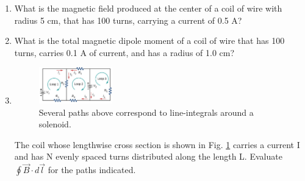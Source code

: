 \documentclass[10pt]{article}
\begin{document}
\begin{enumerate}
\begin{enumerate}
\item What is the magnetic field produced at the center of a coil of wire with radius 5 cm, that has 100 turns, carrying a current of 0.5 A? \\ \vspace{2 cm}
\item What is the total magnetic dipole moment of a coil of wire that has 100 turns, carries 0.1 A of current, and has a radius of 1.0 cm? \\ \vspace{2cm}
\item
\begin{figure}[hb]
\centering
\includegraphics[width=0.3\textwidth]{circuit2.png}
\caption{\label{fig:circuit2} Several paths above correspond to line-integrals around a solenoid.}
\end{figure}
The coil whose lengthwise cross section is shown in Fig. \ref{fig:circuit2} carries a current I and has N evenly spaced turns distributed along the length L. Evaluate $\oint \vec{B} \cdot d\vec{l}$ for the paths indicated.
\end{enumerate}
\end{enumerate}
\end{document}
